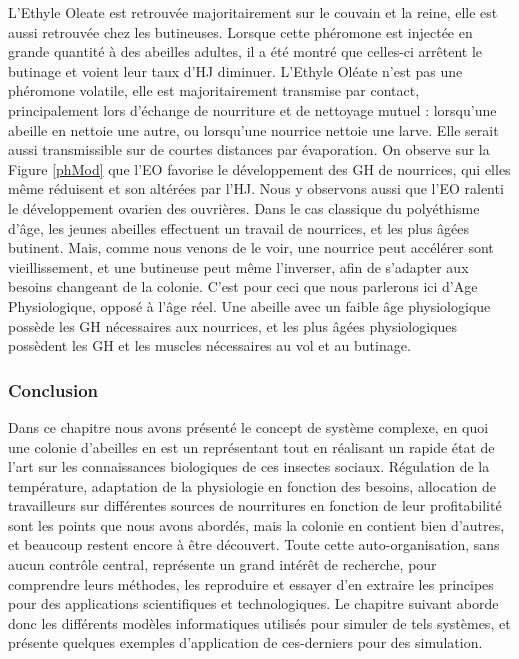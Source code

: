			 L'Ethyle Oleate est retrouvée majoritairement sur le couvain et la reine, elle est aussi retrouvée chez les butineuses. Lorsque cette phéromone est injectée en grande quantité à des abeilles adultes, il a été montré que celles-ci arrêtent le butinage et voient leur taux d'HJ diminuer. L'Ethyle Oléate n'est pas une phéromone volatile, elle est majoritairement transmise par contact, principalement lors d'échange de nourriture et de nettoyage mutuel : lorsqu'une abeille en nettoie une autre, ou lorsqu'une nourrice nettoie une larve. Elle serait aussi transmissible sur de courtes distances par évaporation. On observe sur la Figure \ref{phMod} que l'EO favorise le développement des GH de nourrices, qui elles même réduisent et son altérées par l'HJ. Nous y observons aussi que l'EO ralenti le développement ovarien des ouvrières. Dans le cas classique du polyéthisme d'âge, les jeunes abeilles effectuent un travail de nourrices, et les plus âgées butinent. Mais, comme nous venons de le voir, une nourrice peut accélérer sont vieillissement, et une butineuse peut même l'inverser, afin de s'adapter aux besoins changeant de la colonie. C'est pour ceci que nous parlerons ici d'Age Physiologique, opposé à l'âge réel. Une abeille avec un faible âge physiologique possède les GH nécessaires aux nourrices, et les plus âgées physiologiques possèdent les GH et les muscles nécessaires au vol et au butinage.
			
		\subsubsection{Conclusion}
			
		Dans ce chapitre nous avons présenté le concept de système complexe, en quoi une colonie d'abeilles en est un représentant tout en réalisant un rapide état de l'art sur les connaissances biologiques de ces insectes sociaux. Régulation de la température, adaptation de la physiologie en fonction des besoins, allocation de travailleurs sur différentes sources de nourritures en fonction de leur profitabilité sont les points que nous avons abordés, mais la colonie en contient bien d'autres, et beaucoup restent encore à être découvert. Toute cette auto-organisation, sans aucun contrôle central, représente un grand intérêt de recherche, pour comprendre leurs méthodes, les reproduire et essayer d'en extraire les principes pour des applications scientifiques et technologiques. Le chapitre suivant aborde donc les différents modèles informatiques utilisés pour simuler de tels systèmes, et présente quelques exemples d'application de ces-derniers pour des simulation.